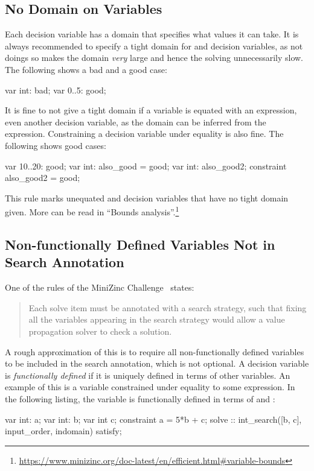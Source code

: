 \documentclass[a4paper,12pt]{article}
\begin{document}
\subsection{No Domain on Variables}\label{sec:rule:nodomain}
Each decision variable has a domain that specifies what values it can take. It is always
recommended to specify a tight domain for  and  decision variables, as not doings so
makes the domain \emph{very} large and hence the solving unnecessarily slow.
The following shows a bad and a good case:
\begin{mznnobreak}
var int: bad;
var 0..5: good;
\end{mznnobreak}
It is fine to not give a tight domain if a variable is equated with an expression, even another decision variable,
as the domain can be inferred from the expression. Constraining a decision variable under equality is also fine.
The following shows good cases:
\begin{mznnobreak}
var 10..20: good;
var int: also_good = good;
var int: also_good2;
constraint also_good2 = good;
\end{mznnobreak}
This rule marks unequated  and  decision variables that have no tight domain given.
More can be read in ``Bounds analysis''.\footnote{\url{https://www.minizinc.org/doc-latest/en/efficient.html\#variable-bounds}}

\subsection{Non-functionally Defined Variables Not in Search Annotation}\label{sec:rule:nonfuncdef}
One of the rules of the MiniZinc Challenge~\cite{MZN:Challenge} states: 
\begin{quote}
Each solve item
must be annotated with a search strategy, such that fixing all the variables appearing in
the search strategy would allow a value propagation solver to check a solution.
\end{quote}
A rough
approximation of this is to require all non-functionally defined variables to be included
in the search annotation, which is not optional.
A decision variable is \emph{functionally defined} if it is uniquely defined in terms of other
variables. An example of this is a variable constrained under equality to some expression.
In the following listing, the variable  is functionally defined in terms of  and :
\begin{mznnobreak}
var int: a; var int: b; var int c;
constraint a = 5*b + c;
solve
  :: int_search([b, c], input_order, indomain)
  satisfy;
\end{mznnobreak}
\end{document}
